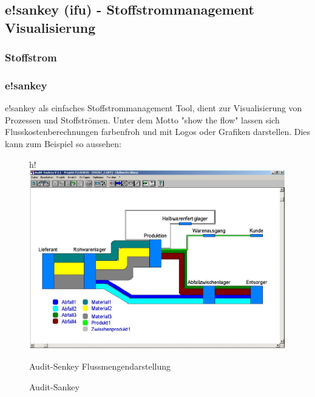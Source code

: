 \documentclass[a4paper, 12pt, twoside, BCOR=20mm, DIV=calc, abstracton, parskip=half*, toc=bibliography, toc=listof, headsepline, footsepline, headings=small, numbers=enddot]{scrreprt}
\begin{document}
\subsection{e!sankey (ifu) - Stoffstrommanagement Visualisierung}
	\subsubsection{Stoffstrom }
\subsubsection{e!sankey}
e!sankey als einfaches Stoffstrommanagement Tool, dient zur Visualisierung von Prozessen und Stoffströmen. Unter dem Motto "show the flow" lassen sich Flusskostenberechnungen farbenfroh und mit Logos oder Grafiken darstellen. Dies kann zum Beispiel so aussehen:
\begin{figure}{h!}
\centering
\includegraphics[width=\textwidth]{Bild/Audit-Sankey.JPG}
\caption{Audit-Sankey}{Audit-Senkey Flussmengendarstellung \cite[S.40]{jurgens2001anforderungen}}
\end{figure}	
\end{document}
